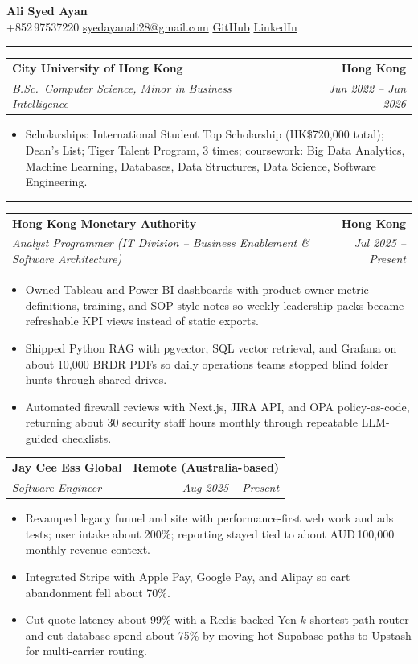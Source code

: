 \documentclass[10pt,a4paper]{article}
\makeatletter
\newcommand{\ressection}[1]{%
  \par\vspace{0.65em}%
  \noindent{\large\scshape\bfseries #1}\par\nobreak
  \noindent\rule{\linewidth}{0.4pt}\par\vspace{0.4em}}
\newcommand{\resumeSubheading}[4]{
  \vspace{0.2em}
  \begin{tabular*}{\textwidth}{l@{\extracolsep{\fill}}r}
    \textbf{#1} & \textbf{#2} \\
    \textit{\small #3} & \textit{\small #4} \\
  \end{tabular*}\vspace{-0.3em}
}
\makeatother
\begin{document}
\begin{center}
  {\LARGE\bfseries Ali Syed Ayan}\\[0.35em]
  \small
  +852\,97537220 \;\textbar\;
  \href{mailto:syedayanali28@gmail.com}{syedayanali28@gmail.com} \;\textbar\;
  \href{https://github.com/syedayanali28}{GitHub} \;\textbar\;
  \href{https://www.linkedin.com/in/syedayanali/}{LinkedIn}
\end{center}
\vspace{-0.2em}

\ressection{Education}
\resumeSubheading{City University of Hong Kong}{Hong Kong}{B.Sc.\ Computer Science, Minor in Business Intelligence}{Jun 2022 -- Jun 2026}
\begin{itemize}
  \item Scholarships: International Student Top Scholarship (HK\$720{,}000 total); Dean's List; Tiger Talent Program, 3 times; coursework: Big Data Analytics, Machine Learning, Databases, Data Structures, Data Science, Software Engineering.
\end{itemize}

\ressection{Work Experience}

\resumeSubheading{Hong Kong Monetary Authority}{Hong Kong}{Analyst Programmer (IT Division -- Business Enablement \& Software Architecture)}{Jul 2025 -- Present}
\begin{itemize}
  \item Owned Tableau and Power BI dashboards with product-owner metric definitions, training, and SOP-style notes so weekly leadership packs became refreshable KPI views instead of static exports.
  \item Shipped Python RAG with pgvector, SQL vector retrieval, and Grafana on about 10{,}000 BRDR PDFs so daily operations teams stopped blind folder hunts through shared drives.
  \item Automated firewall reviews with Next.js, JIRA API, and OPA policy-as-code, returning about 30 security staff hours monthly through repeatable LLM-guided checklists.
\end{itemize}

\resumeSubheading{Jay Cee Ess Global}{Remote (Australia-based)}{Software Engineer}{Aug 2025 -- Present}
\begin{itemize}
  \item Revamped legacy funnel and site with performance-first web work and ads tests; user intake about 200\%; reporting stayed tied to about AUD\,100{,}000 monthly revenue context.
  \item Integrated Stripe with Apple Pay, Google Pay, and Alipay so cart abandonment fell about 70\%.
  \item Cut quote latency about 99\% with a Redis-backed Yen $k$-shortest-path router and cut database spend about 75\% by moving hot Supabase paths to Upstash for multi-carrier routing.
\end{itemize}
\end{document}
